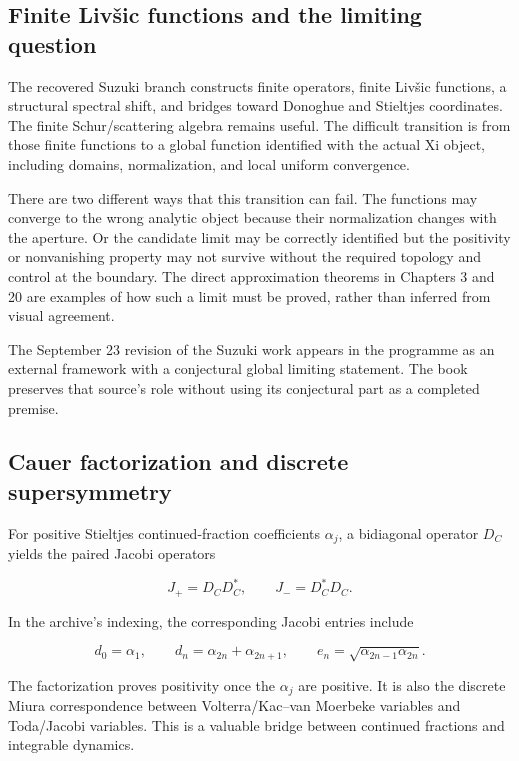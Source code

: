 \documentclass[
  10pt,
  a4paper,
  10pt,
  oneside,
  openany]{book}
\begin{document}
\subsection{Finite Livšic functions and the limiting
question}\label{finite-livux161ic-functions-and-the-limiting-question}

The recovered Suzuki branch constructs finite operators, finite Livšic
functions, a structural spectral shift, and bridges toward Donoghue and
Stieltjes coordinates. The finite Schur/scattering algebra remains
useful. The difficult transition is from those finite functions to a
global function identified with the actual Xi object, including domains,
normalization, and local uniform convergence.

There are two different ways that this transition can fail. The
functions may converge to the wrong analytic object because their
normalization changes with the aperture. Or the candidate limit may be
correctly identified but the positivity or nonvanishing property may not
survive without the required topology and control at the boundary. The
direct approximation theorems in Chapters 3 and 20 are examples of how
such a limit must be proved, rather than inferred from visual agreement.

The September 23 revision of the Suzuki work appears in the programme as
an external framework with a conjectural global limiting statement. The
book preserves that source's role without using its conjectural part as
a completed premise.

\subsection{Cauer factorization and discrete
supersymmetry}\label{cauer-factorization-and-discrete-supersymmetry}

For positive Stieltjes continued-fraction coefficients \(\alpha_j\), a
bidiagonal operator \(D_C\) yields the paired Jacobi operators

\[
 J_+=D_CD_C^{*},\qquad J_-=D_C^{*}D_C.
 \tag{41.1}\label{eq:41.1}
\]

In the archive's indexing, the corresponding Jacobi entries include

\[
 d_0=\alpha_1,\qquad
 d_n=\alpha_{2n}+\alpha_{2n+1},\qquad
 e_n=\sqrt{\alpha_{2n-1}\alpha_{2n}}.
 \tag{41.2}\label{eq:41.2}
\]

The factorization proves positivity once the \(\alpha_j\) are positive.
It is also the discrete Miura correspondence between Volterra/Kac--van
Moerbeke variables and Toda/Jacobi variables. This is a valuable bridge
between continued fractions and integrable dynamics.
\end{document}
